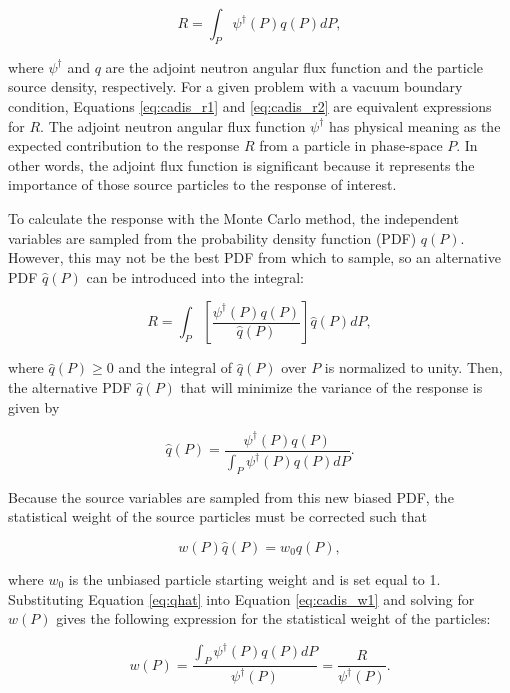 \documentclass{article} %
\newcommand{\qhat}{\ensuremath{\hat{q}}}
\begin{document}
\begin{equation}
R = \int_P \psi^{\dagger}(P)q(P)dP,
\label{eq:cadis_r2}
\end{equation}

\noindent where $\psi^{\dagger}$ and $q$ are the adjoint neutron angular flux
function and the particle source density, respectively. For a given problem
with a vacuum boundary condition, Equations \ref{eq:cadis_r1} and
\ref{eq:cadis_r2} are equivalent expressions for $R$. The adjoint neutron
angular flux function $\psi^{\dagger}$ has physical meaning as the expected
contribution to the response $R$ from a particle in phase-space $P$. In other
words, the adjoint flux function is significant because it represents the
importance of those source particles to the response of interest.

To calculate the response with the Monte Carlo method, the independent
variables are sampled from the probability density function (PDF) $q(P)$.
However, this may not be the best PDF from which to sample, so an alternative
PDF $\qhat(P)$ can be introduced into the integral:

\begin{equation}
R = \int_P \left[\frac{\psi^{\dagger}(P)q(P)}{\qhat(P)}\right]\qhat(P)dP,
\end{equation}

\noindent where $\qhat(P) \geq 0$ and the integral of $\qhat(P)$ over $P$ is 
normalized to unity. Then, the alternative PDF $\qhat(P)$ that will minimize
the variance of the response is given by

\begin{equation}
\qhat(P) = \frac{\psi^{\dagger}(P)q(P)}{\int_P\psi^{\dagger}(P)q(P)dP}.
\label{eq:qhat}
\end{equation}

Because the source variables are sampled from this new biased PDF, the
statistical weight of the source particles must be corrected such that

\begin{equation}
w(P)\qhat(P) = w_0q(P),
\label{eq:cadis_w1}
\end{equation}

\noindent where $w_0$ is the unbiased particle starting weight and is set equal
to 1. Substituting Equation \ref{eq:qhat} into Equation \ref{eq:cadis_w1} and
solving for $w(P)$ gives the following expression for the statistical weight of
the particles:

\begin{equation}
w(P) = \frac{\int_P\psi^{\dagger}(P)q(P)dP}{\psi^{\dagger}(P)}
= \frac{R}{\psi^{\dagger}(P)}.
\label{eq:cadis_w2}
\end{equation}
\end{document}
